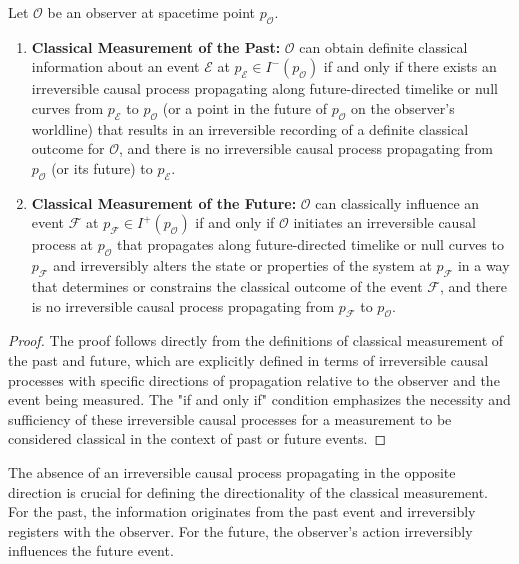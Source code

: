 	\begin{theorem}
		Let $\mathcal{O}$ be an observer at spacetime point $p_{\mathcal{O}}$.
		
		\begin{enumerate}
			\item \textbf{Classical Measurement of the Past:} $\mathcal{O}$ can obtain definite classical information about an event $\mathcal{E}$ at $p_{\mathcal{E}} \in I^-(p_{\mathcal{O}})$ if and only if there exists an irreversible causal process propagating along future-directed timelike or null curves from $p_{\mathcal{E}}$ to $p_{\mathcal{O}}$ (or a point in the future of $p_{\mathcal{O}}$ on the observer's worldline) that results in an irreversible recording of a definite classical outcome for $\mathcal{O}$, and there is no irreversible causal process propagating from $p_{\mathcal{O}}$ (or its future) to $p_{\mathcal{E}}$.
			
			\item \textbf{Classical Measurement of the Future:} $\mathcal{O}$ can classically influence an event $\mathcal{F}$ at $p_{\mathcal{F}} \in I^+(p_{\mathcal{O}})$ if and only if $\mathcal{O}$ initiates an irreversible causal process at $p_{\mathcal{O}}$ that propagates along future-directed timelike or null curves to $p_{\mathcal{F}}$ and irreversibly alters the state or properties of the system at $p_{\mathcal{F}}$ in a way that determines or constrains the classical outcome of the event $\mathcal{F}$, and there is no irreversible causal process propagating from $p_{\mathcal{F}}$ to $p_{\mathcal{O}}$.
		\end{enumerate}
		\begin{proof}
			The proof follows directly from the definitions of classical measurement of the past and future, which are explicitly defined in terms of irreversible causal processes with specific directions of propagation relative to the observer and the event being measured. The "if and only if" condition emphasizes the necessity and sufficiency of these irreversible causal processes for a measurement to be considered classical in the context of past or future events.
		\end{proof}
	\end{theorem}
	
	\begin{remark}
		The absence of an irreversible causal process propagating in the opposite direction is crucial for defining the directionality of the classical measurement. For the past, the information originates from the past event and irreversibly registers with the observer. For the future, the observer's action irreversibly influences the future event.
	\end{remark}
	

